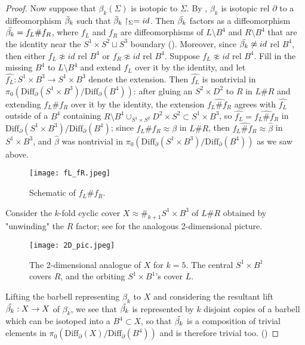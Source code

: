 \documentclass[11pt,letterpaper,twoside]{amsart}
\theoremstyle{definition}
\begin{document}
\begin{proof}
     \noindent Now suppose that $\beta_k(\Sigma)$ is isotopic to $\Sigma$. By \cite{Ce}, $\beta_k$ is isotopic rel $\partial$ to a diffeomorphism $\Bar{\beta}_k$ such that $\Bar{\beta}_k\restriction_\Sigma=id$. Then $\Bar{\beta_k}$ factors as a diffeomorphism $\Bar{\beta_k}=f_L \# f_R$, where $f_L$ and $f_R$ are diffeomorphisms of $L \setminus B^4$ and $R \setminus B^4$ that are the identity near the $S^1 \times S^2 \sqcup S^3$ boundary (). Moreover, since $\Bar{\beta_k}\not\approx id$ rel $B^4$, then either $f_L\not\approx id$ rel $B^4$ or $f_R\not\approx id$ rel $B^4$. Suppose $f_L\not\approx id$ rel $B^4$. Fill in the missing $B^4$ to $L\setminus B^4$ and extend $f_L$ over it by the identity, and let $\hat{f_L}: S^1 \times B^3 \rightarrow S^1 \times B^3$ denote the extension. Then $\hat{f_L}$ is nontrivial in $\pi_0(\text{Diff}_\partial (S^1 \times B^3)/\text{Diff}_\partial (B^4))$: after gluing an $S^2 \times D^2$ to $R$ in $L \# R$ and extending $f_L \# f_R$ over it by the identity, the extension $\hat{f_L \# f_R}$ agrees with $\hat{f_L}$ outside of a $B^4$ containing $R\setminus B^4 \cup_{S^1\times S^2} D^2 \times S^2 \subset S^1 \times B^3$, so $\hat{f_L}=\hat{f_L \# f_R}$ in $\text{Diff}_\partial (S^1 \times B^3)/\text{Diff}_\partial (B^4)$; since $f_L \# f_R \approx \beta$ in $L \# R$, then $\hat{f_L \# f_R} \approx \hat{\beta}$ in $S^1 \times B^3$, and $\hat{\beta}$ was nontrivial in $\pi_0(\text{Diff}_\partial (S^1 \times B^3)/\text{Diff}_\partial (B^4))$ as we saw above.
     
     \begin{figure}[h!]
         \centering
         \texttt{[image: fL\_fR.jpeg]}
         \caption{Schematic of $f_L \# f_R$.}
         \label{fLfR}
     \end{figure}

     \noindent Consider the $k$-fold cyclic cover $X\approx \#_{k+1} S^1 \times B^3$ of $L \# R$ obtained by "unwinding" the $R$ factor; see  for the analogous 2-dimensional picture.

     \begin{figure}[h!]
         \centering
         \texttt{[image: 2D\_pic.jpeg]}
         \caption{The 2-dimensional analogue of $X$ for $k=5$. The central $S^1 \times B^1$ covers $R$, and the orbiting $S^1 \times B^1$'s cover $L$.}
         \label{2D pic}
     \end{figure}

     \noindent Lifting the barbell representing $\beta_k$ to $X$ and considering the resultant lift $\Tilde{\beta_k}:X \rightarrow X$ of $\beta_k$, we see that $\Tilde{\beta_k}$ is represented by $k$ disjoint copies of a barbell which can be isotoped into a $B^4\subset X$, so that $\Tilde{\beta_k}$ is a composition of trivial elements in $\pi_0(\text{Diff}_\partial(X)/\text{Diff}_\partial(B^4))$ and is therefore trivial too. ()


\end{proof}
\end{document}
